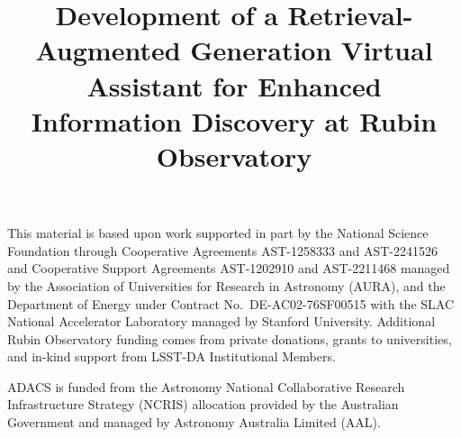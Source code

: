 \documentclass[]{spie}
\begin{document}

\title{Development of a Retrieval-Augmented Generation Virtual Assistant for Enhanced Information Discovery at Rubin Observatory}


\maketitle






\acknowledgments

This material is based upon work supported in part by the National Science Foundation through Cooperative Agreements AST-1258333 and AST-2241526 and Cooperative Support Agreements AST-1202910 and AST-2211468 managed by the Association of Universities for Research in Astronomy (AURA), and the Department of Energy under Contract No.\ DE-AC02-76SF00515 with the SLAC National Accelerator Laboratory managed by Stanford University.
Additional Rubin Observatory funding comes from private donations, grants to universities, and in-kind support from LSST-DA Institutional Members.

ADACS is funded from the Astronomy National Collaborative Research Infrastructure Strategy (NCRIS) allocation provided by the Australian Government and managed by Astronomy Australia Limited (AAL).




\printglossaries
\end{document}
